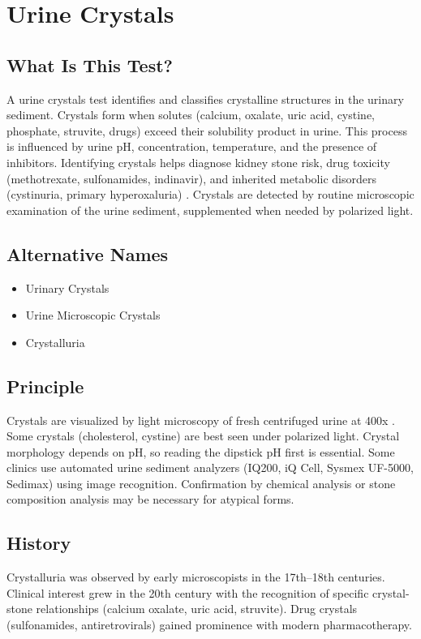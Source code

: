 \chapter{Urine Crystals}

\section*{What Is This Test?}
A urine crystals test identifies and classifies crystalline structures in the urinary sediment. Crystals form when solutes (calcium, oxalate, uric acid, cystine, phosphate, struvite, drugs) exceed their solubility product in urine. This process is influenced by urine pH, concentration, temperature, and the presence of inhibitors. Identifying crystals helps diagnose kidney stone risk, drug toxicity (methotrexate, sulfonamides, indinavir), and inherited metabolic disorders (cystinuria, primary hyperoxaluria) \cite{strasinger2020urinalysis}. Crystals are detected by routine microscopic examination of the urine sediment, supplemented when needed by polarized light.

\section*{Alternative Names}
\begin{itemize}
  \item Urinary Crystals
  \item Urine Microscopic Crystals
  \item Crystalluria
\end{itemize}
\section*{Principle}
Crystals are visualized by light microscopy of fresh centrifuged urine at 400x \cite{mcpherson2022henrys}. Some crystals (cholesterol, cystine) are best seen under polarized light. Crystal morphology depends on pH, so reading the dipstick pH first is essential. Some clinics use automated urine sediment analyzers (IQ200, iQ Cell, Sysmex UF-5000, Sedimax) using image recognition. Confirmation by chemical analysis or stone composition analysis may be necessary for atypical forms.

\section*{History}
Crystalluria was observed by early microscopists in the 17th--18th centuries. Clinical interest grew in the 20th century with the recognition of specific crystal-stone relationships (calcium oxalate, uric acid, struvite). Drug crystals (sulfonamides, antiretrovirals) gained prominence with modern pharmacotherapy.

